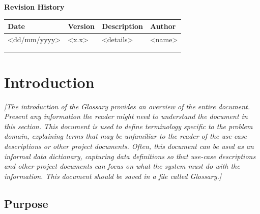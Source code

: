 \documentclass[12pt, a4paper, titlepage]{article}
\begin{document}
\begin{titlepage}
\vspace{2cm}
\begin{center}
	\large{\textbf{Revision History}}
	
    \begin{tabular}{ | p{4cm} | p{2cm} | p{5cm} | p{4cm} |}
    \hline
    \textbf{Date} & \textbf{Version} & \textbf{Description} & \textbf{Author} \\ \hline
    \textless dd/mm/yyyy\textgreater & \textless x.x\textgreater & \textless details\textgreater & \textless name\textgreater  \\ \hline
    & & & \\ \hline
    & & & \\ \hline
    \end{tabular}
\end{center}

\end{titlepage}
\clearpage


\tableofcontents
\clearpage

\section{Introduction}

\textit{{\color{blue}[The introduction of the Glossary provides an overview of the entire document. Present any information the reader might need to understand the document in this section. This document is used to define terminology specific to the problem domain, explaining terms that may be unfamiliar to the reader of the use-case descriptions or other project documents. Often, this document can be used as an informal data dictionary, capturing data definitions so that use-case descriptions and other project documents can focus on what the system must do with the information. This document should be saved in a file called Glossary.]}}

\subsection{Purpose}
\end{document}
